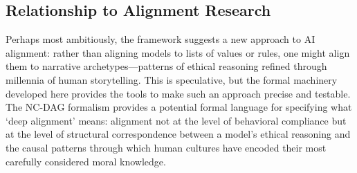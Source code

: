 \documentclass[11pt,letterpaper]{article}
\theoremstyle{defn}
\begin{document}
\subsection{Relationship to Alignment Research}

Perhaps most ambitiously, the framework suggests a new approach to AI alignment: rather than aligning models to lists of values or rules, one might align them to narrative archetypes---patterns of ethical reasoning refined through millennia of human storytelling. This is speculative, but the formal machinery developed here provides the tools to make such an approach precise and testable. The NC-DAG formalism provides a potential formal language for specifying what `deep alignment' means: alignment not at the level of behavioral compliance but at the level of structural correspondence between a model's ethical reasoning and the causal patterns through which human cultures have encoded their most carefully considered moral knowledge.


\end{document}
